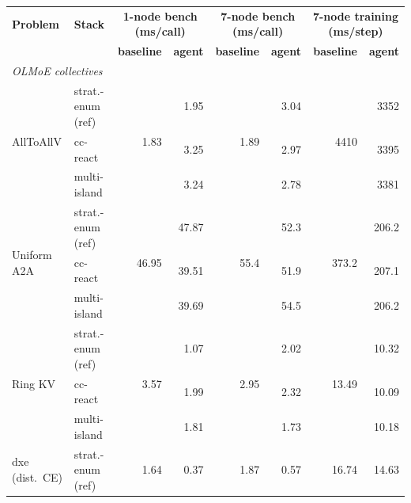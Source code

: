 \begin{table}[!htbp]
\centering\scriptsize
\setlength{\tabcolsep}{3pt}
\begin{tabular}{llrrrrrr}
\toprule
\textbf{Problem} & \textbf{Stack} & \multicolumn{2}{c}{\textbf{1-node bench (ms/call)}} & \multicolumn{2}{c}{\textbf{7-node bench (ms/call)}} & \multicolumn{2}{c}{\textbf{7-node training (ms/step)}} \\
                 &                & \textbf{baseline} & \textbf{agent} & \textbf{baseline} & \textbf{agent} & \textbf{baseline} & \textbf{agent} \\
\midrule
\multicolumn{8}{l}{\textit{OLMoE collectives}} \\
\multirow{3}{*}{AllToAllV}      & strat.-enum (ref)  & \multirow{3}{*}{1.83} &  1.95 & \multirow{3}{*}{1.89} &  3.04 & \multirow{3}{*}{4410} & 3352 \\
                                & cc-react           &                       &  3.25 &                       &  2.97 &                       & 3395 \\
                                & multi-island       &                       &  3.24 &                       &  2.78 &                       & 3381 \\
\midrule
\multirow{3}{*}{Uniform A2A}    & strat.-enum (ref)  & \multirow{3}{*}{46.95} & 47.87 & \multirow{3}{*}{55.4} & 52.3 & \multirow{3}{*}{373.2} & 206.2 \\
                                & cc-react           &                        & 39.51 &                       & 51.9 &                        & 207.1 \\
                                & multi-island       &                        & 39.69 &                       & 54.5 &                        & 206.2 \\
\midrule
\multirow{3}{*}{Ring KV}        & strat.-enum (ref)  & \multirow{3}{*}{3.57} &  1.07 & \multirow{3}{*}{2.95} &  2.02 & \multirow{3}{*}{13.49} & 10.32 \\
                                & cc-react           &                       &  1.99 &                       &  2.32 &                        & 10.09 \\
                                & multi-island       &                       &  1.81 &                       &  1.73 &                        & 10.18 \\
\midrule
\multirow{3}{*}{dxe (dist.\ CE)}& strat.-enum (ref)  & \multirow{3}{*}{1.64} &  0.37 & \multirow{3}{*}{1.87} &  0.57 & \multirow{3}{*}{16.74} & 14.63 \\

\end{tabular}
\end{table}
